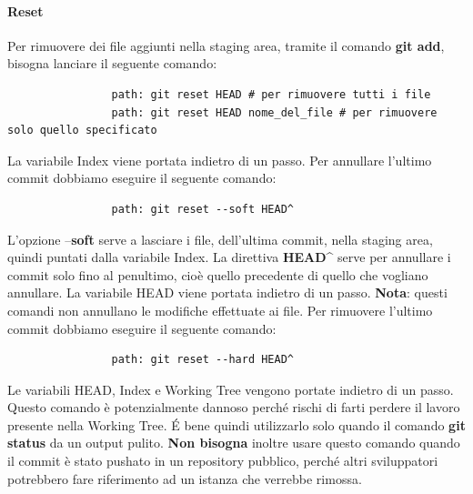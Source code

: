 			\paragraph{Reset} %
			\label{par:reset}
			Per rimuovere dei file aggiunti nella staging area, tramite il comando \textbf{git add}, bisogna lanciare il seguente comando:
				\begin{verbatim}
				path: git reset HEAD # per rimuovere tutti i file
				path: git reset HEAD nome_del_file # per rimuovere solo quello specificato
				\end{verbatim}
			\noindent
			La variabile Index viene portata indietro di un passo. \newline \newline
			Per annullare l'ultimo commit dobbiamo eseguire il seguente comando:
				\begin{verbatim}
				path: git reset --soft HEAD^
				\end{verbatim}
			\noindent
			L'opzione --\textbf{soft} serve a lasciare i file, dell'ultima commit, nella staging area, quindi puntati dalla variabile Index. \newline
			La direttiva \textbf{HEAD\^} serve per annullare i commit solo fino al penultimo, cioè quello precedente di quello che vogliano annullare. \newline
			La variabile HEAD viene portata indietro di un passo. \newline
			\textbf{Nota}: questi comandi non annullano le modifiche effettuate ai file. \newline \newline
			Per rimuovere l'ultimo commit dobbiamo eseguire il seguente comando:
				\begin{verbatim}
				path: git reset --hard HEAD^
				\end{verbatim}
			\noindent
			Le variabili HEAD, Index e Working Tree vengono portate indietro di un passo. \newline
			Questo comando è potenzialmente dannoso perché rischi di farti perdere il lavoro presente nella Working Tree. \'E bene quindi utilizzarlo solo quando il comando \textbf{git status} da un output pulito. \newline
			\textbf{Non bisogna} inoltre usare questo comando quando il commit è stato pushato in un repository pubblico, perché altri sviluppatori potrebbero fare riferimento ad un istanza che verrebbe rimossa.
			
		
